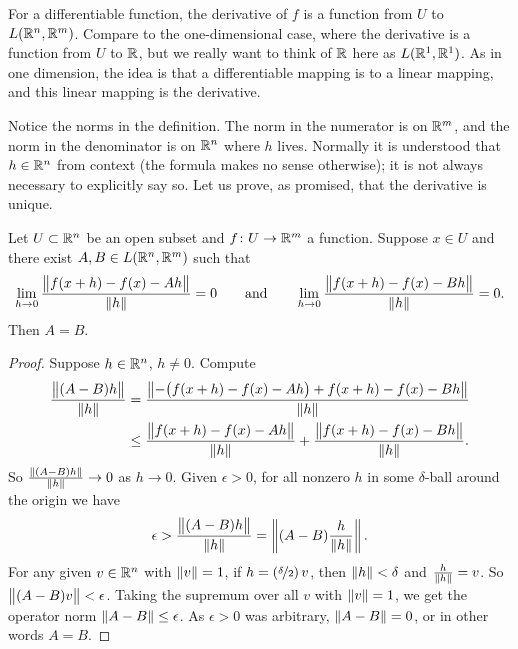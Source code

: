 For a differentiable function,
the derivative of $f$ is a function from $U$ to $L({\mathbb{R}}^n,{\mathbb{R}}^m)$.  Compare
to the one-dimensional case, where the derivative is a function
from $U$ to ${\mathbb{R}}$, but we really want to think of ${\mathbb{R}}$ here as
$L({\mathbb{R}}^1,{\mathbb{R}}^1)$.  As in one dimension, the idea is that a differentiable
mapping is  to a linear mapping, and this
linear mapping is the derivative.

Notice the norms in the definition.
The norm in the
numerator is on ${\mathbb{R}}^m$, and the norm in the denominator is on ${\mathbb{R}}^n$ where $h$
lives.
Normally it is understood that $h \in {\mathbb{R}}^n$ from context
(the formula makes no sense otherwise);
it is not always necessary to explicitly say so.
Let us prove, as promised, that the derivative is unique.

\begin{prop}
Let $U \subset {\mathbb{R}}^n$ be an open subset and $f \colon U \to {\mathbb{R}}^m$ a function.  Suppose
$x \in U$ and there exist 
$A,B \in L({\mathbb{R}}^n,{\mathbb{R}}^m)$ such that
\begin{equation*}
\lim_{h \to 0}
\frac{\bigl\lVert {f(x+h)-f(x) - Ah} \bigr\rVert}{\lVert {h} \rVert} = 0
\qquad \text{and} \qquad
\lim_{h \to 0}
\frac{\bigl\lVert {f(x+h)-f(x) - Bh} \bigr\rVert}{\lVert {h} \rVert} = 0 .
\end{equation*}
Then $A=B$.
\end{prop}

\begin{proof}
Suppose $h \in {\mathbb{R}}^n$, $h \neq 0$.  Compute
\begin{equation*}
\begin{split}
\frac{\bigl\lVert {(A-B)h} \bigr\rVert}{\lVert {h} \rVert} & =
\frac{\bigl\lVert {-\bigl(f(x+h)-f(x) - Ah\bigr) + f(x+h)-f(x) - Bh} \bigr\rVert}{\lVert {h} \rVert} \\
& \leq
\frac{\bigl\lVert {f(x+h)-f(x) - Ah} \bigr\rVert}{\lVert {h} \rVert} + \frac{\bigl\lVert {f(x+h)-f(x) -
Bh} \bigr\rVert}{\lVert {h} \rVert} .
\end{split}
\end{equation*}
So 
$\frac{\lVert {(A-B)h} \rVert}{\lVert {h} \rVert} \to 0$ as $h \to 0$.  Given
$\epsilon > 0$, for all nonzero $h$ in some $\delta$-ball around
the origin we have
\begin{equation*}
\epsilon > 
\frac{\bigl\lVert {(A-B)h} \bigr\rVert}{\lVert {h} \rVert}
=
\left\lVert {(A-B)\frac{h}{\lVert {h} \rVert}} \right\rVert .
\end{equation*}
For any given $v \in {\mathbb{R}}^n$ with $\lVert {v} \rVert=1$,
if $h = (\nicefrac{\delta}{2}) \, v$, then $\lVert {h} \rVert < \delta$
and $\frac{h}{\lVert {h} \rVert} = v$.
So $\bigl\lVert {(A-B)v} \bigr\rVert < \epsilon$.  Taking the supremum over all $v$ with
$\lVert {v} \rVert = 1$, we get the operator norm
$\lVert {A-B} \rVert \leq \epsilon$.  As $\epsilon > 0$
was arbitrary, $\lVert {A-B} \rVert = 0$, or in other words $A = B$.
\end{proof}

